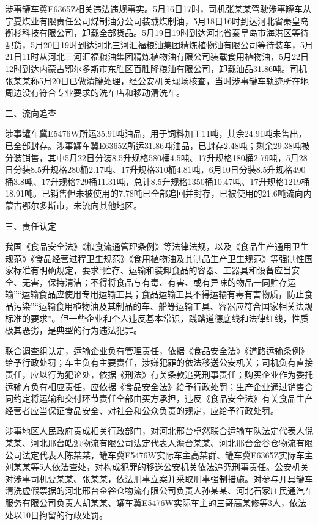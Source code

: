 涉事罐车冀E6365Z相关违法违规事实。5月16日17时，司机张某某驾驶涉事罐车从宁夏煤业有限责任公司煤制油分公司装载煤制油，5月18日16时到达河北省秦皇岛衡杉科技有限公司，卸载全部货品。5月19日19时到达河北省秦皇岛市海港区等待配货，5月20日19时到达河北三河汇福粮油集团精炼植物油有限公司等待装车，5月21日11时从河北三河汇福粮油集团精炼植物油有限公司装载食用植物油，5月22日12时到达内蒙古鄂尔多斯市东胜区百胜隆粮油有限公司，卸载油品31.86吨。司机张某某称5月20日已做清罐处理，经公安机关现场核查，当时涉事罐车轨迹所在地周边没有符合专业要求的洗车店和移动清洗车。

二、流向追查

涉事罐车冀E5476W所运35.91吨油品，用于饲料加工11吨，其余24.91吨未售出，已全部封存。涉事罐车冀E6365Z所运31.86吨油品，已封存2.48吨；剩余29.38吨被分装销售，其中5月22日分装8.5升规格580桶4.5吨、17升规格180桶2.79吨，5月28日分装8.5升规格280桶2.17吨、17升规格310桶4.81吨，6月10日分装8.5升规格490桶3.8吨、17升规格729桶11.31吨，总计8.5升规格1350桶10.47吨、17升规格1219桶18.91吨。已销售但未被使用的7.78吨已全部追回并封存，已被使用的21.6吨流向内蒙古鄂尔多斯市，未流向其他地区。

三、责任认定

我国《食品安全法》《粮食流通管理条例》等法律法规，以及《食品生产通用卫生规范》《食品经营过程卫生规范》《食用植物油及其制品生产卫生规范》等强制性国家标准有明确规定，要求“贮存、运输和装卸食品的容器、工器具和设备应当安全、无害，保持清洁；不得将食品与有毒、有害、或有异味的物品一同贮存运输”“运输食品应使用专用运输工具；食品运输工具不得运输有毒有害物质，防止食品污染”“运输食用植物油及其制品的车、船等运输工具、容器应符合国家相关法规标准的要求”。但一些企业和个人违反基本常识，践踏道德底线和法律红线，性质极其恶劣，是典型的行为违法犯罪。

联合调查组认定，运输企业负有管理责任，依据《食品安全法》《道路运输条例》给予行政处罚；车主负有主要责任，涉嫌犯罪的依法移送公安机关；司机负有直接责任，应以行为犯论处，依据《刑法》有关条款追究刑事责任；购买企业作为委托运输方负有相应责任，应依据《食品安全法》给予行政处罚；生产企业通过销售合同约定将运输和交付环节责任全部由买方承担，违反《食品安全法》有关食品生产经营者应当保证食品安全、对社会和公众负责的规定，应给予行政处罚。

涉事地区人民政府责成相关行政部门，对河北邢台卓然联合运输车队法定代表人倪某某、河北邢台皓源物流有限公司法定代表人澹台某某、河北邢台金谷仓物流有限公司法定代表人陈某某，罐车冀E5476W实际车主高某群、罐车冀E6365Z实际车主刘某某等5人依法查处，对构成犯罪的移送公安机关依法追究刑事责任。公安机关对涉事司机要某某、张某某，依法刑事立案并采取刑事强制措施。对参与开具罐车清洗虚假票据的河北邢台金谷仓物流有限公司负责人孙某某、河北石家庄民通汽车服务有限公司负责人胡某某、罐车冀E5476W实际车主的三哥高某修等3人，依法处以10日拘留的行政处罚。

